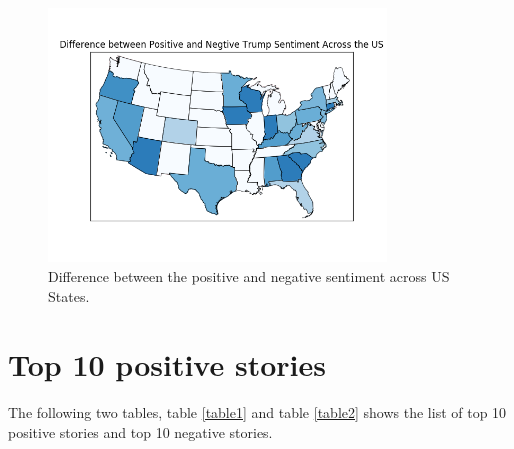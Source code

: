 \documentclass[12pt]{article}
\begin{document}
\begin{figure}[!h]
     \begin{center}
                  \includegraphics[width=0.8\textwidth]{../plots/part3.png}
    \end{center}
    \caption{%
       Difference between the positive and negative sentiment across US States.
     }%
     \label {fig:4}
 \end{figure}
 
 
 \section{Top 10 positive stories}
The following two tables, table \ref{table1} and table \ref{table2} shows the list of top 10 positive stories and top 10 negative stories.\\
\begin{table}[!h]
\center
\caption{Top 10 positive stories}
\label{table1}
\end{table}


\begin{table}[!h]
\center
\caption{Top 10 negtive stories}
\label{table2}
\end{table}
\end{document}
